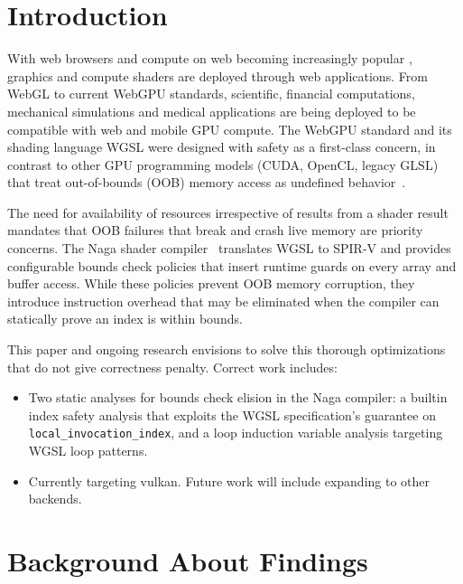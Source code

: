 \documentclass[11pt,a4paper]{article}
\begin{document}
\section{Introduction}
\label{sec:intro}

With web browsers and compute on web becoming  increasingly popular , graphics and compute shaders are deployed through web applications. From WebGL to current WebGPU standards, scientific, financial computations, mechanical simulations and medical applications are being deployed to be compatible with web and mobile GPU compute. 
The WebGPU standard and its shading
language WGSL were designed with safety as a first-class concern, in contrast
to other GPU programming models (CUDA, OpenCL, legacy GLSL) that treat
out-of-bounds (OOB) memory access as undefined behavior~\cite{webgpu_spec,wgsl_spec}.

The need for availability of resources irrespective of results from a shader result mandates that OOB failures that break and crash live memory are priority concerns.
The Naga shader compiler~\cite{naga_repo} translates WGSL to SPIR-V and
provides configurable bounds check policies that insert runtime guards on
every array and buffer access. While these policies prevent OOB memory
corruption, they introduce instruction overhead that may be eliminated when
the compiler can statically prove an index is within bounds.

This paper and ongoing research envisions to solve this thorough optimizations that do not give correctness penalty. Correct work includes:
\begin{itemize}
  \item Two static analyses for bounds check elision in the Naga compiler:
  a builtin index safety analysis that exploits the WGSL specification's
  guarantee on \texttt{local\_invocation\_index}, and a loop induction
  variable analysis targeting WGSL loop patterns. 
  \item Currently targeting vulkan. Future work will include expanding to other backends.

\end{itemize}

\section{Background About Findings}
\label{sec:background}
\end{document}
